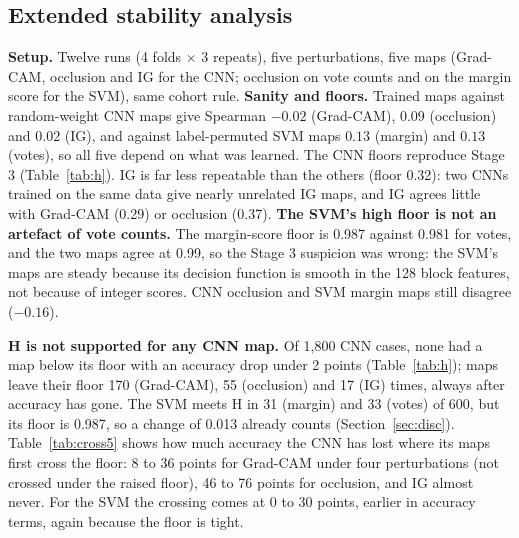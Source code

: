 \documentclass[11pt]{article}
\begin{document}
\subsection{Extended stability analysis}\label{sec:ext}
\textbf{Setup.} Twelve runs (4 folds $\times$ 3 repeats), five perturbations, five maps (Grad-CAM, occlusion and IG for the CNN; occlusion on vote counts and on the margin score for the SVM), same cohort rule. \textbf{Sanity and floors.} Trained maps against random-weight CNN maps give Spearman $-0.02$ (Grad-CAM), $0.09$ (occlusion) and $0.02$ (IG), and against label-permuted SVM maps $0.13$ (margin) and $0.13$ (votes), so all five depend on what was learned. The CNN floors reproduce Stage 3 (Table~\ref{tab:h}). IG is far less repeatable than the others (floor 0.32): two CNNs trained on the same data give nearly unrelated IG maps, and IG agrees little with Grad-CAM (0.29) or occlusion (0.37). \textbf{The SVM's high floor is not an artefact of vote counts.} The margin-score floor is 0.987 against 0.981 for votes, and the two maps agree at 0.99, so the Stage 3 suspicion was wrong: the SVM's maps are steady because its decision function is smooth in the 128 block features, not because of integer scores. CNN occlusion and SVM margin maps still disagree ($-0.16$).

\begin{table}[!tb]
\centering
\small

\caption{Hypothesis H over 12 runs and 50 conditions (5 perturbations $\times$ 10 calibration levels) $=600$ per map. ``Below floor'': map similarity under the seed floor; ``H met'': also own-model accuracy drop under 2 points. For the CNN, H is met in 0 of 1{,}800.}
\label{tab:h}
\end{table}

\textbf{H is not supported for any CNN map.} Of 1{,}800 CNN cases, none had a map below its floor with an accuracy drop under 2 points (Table~\ref{tab:h}); maps leave their floor 170 (Grad-CAM), 55 (occlusion) and 17 (IG) times, always after accuracy has gone. The SVM meets H in 31 (margin) and 33 (votes) of 600, but its floor is 0.987, so a change of 0.013 already counts (Section~\ref{sec:disc}). Table~\ref{tab:cross5} shows how much accuracy the CNN has lost where its maps first cross the floor: 8 to 36 points for Grad-CAM under four perturbations (not crossed under the raised floor), 46 to 76 points for occlusion, and IG almost never. For the SVM the crossing comes at 0 to 30 points, earlier in accuracy terms, again because the floor is tight.
\end{document}
